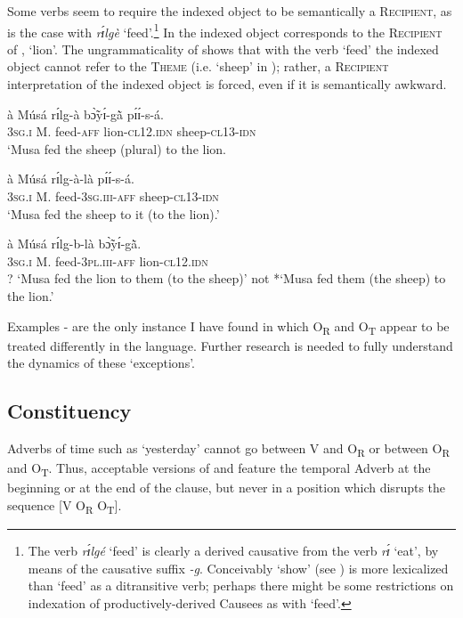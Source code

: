 \documentclass[output=paper]{langsci/langscibook}
\begin{document}
Some verbs seem to require the indexed object to be semantically a \textsc{Recipient}, as is the case with \textit{rɪ́lgè} `feed'.\footnote{ The verb \textit{rɪ́lgé} `feed' is clearly a derived causative from the verb \textit{rɪ́} `eat', by means of the causative suffix \textit{-g}. Conceivably `show' (see ) is more lexicalized than `feed' as a ditransitive verb; perhaps there might be some restrictions on indexation of productively-derived Causees as with `feed'.} In  the indexed object corresponds to the \textsc{Recipient} of , `lion'. The ungrammaticality of  shows that with the verb `feed' the indexed object cannot refer to the \textsc{Theme} (i.e. `sheep' in ); rather, a \textsc{Recipient} interpretation of the indexed object is forced, even if it is semantically awkward.

\ea
\label{ex:28.pacchiarotti}
\gll à    Músá  rɪ́lg-à    bɔ̃̀yɪ́-g\`{ã}    pɪ́ɪ́-s-á.\\
\textsc{3sg.i}    M.  feed-\textsc{aff}  lion-\textsc{cl12.idn}  sheep-\textsc{cl13-idn}\\
\glt `Musa fed the sheep (plural) to the lion.
\z

\ea
\label{ex:29.pacchiarotti}
\gll à    Músá    rɪ́lg-à-là    pɪ́ɪ́-s-á.\\
\textsc{3sg.i}    M.    feed-\textsc{3sg.iii-aff}  sheep-\textsc{cl13-idn}\\
\glt `Musa fed the sheep to it (to the lion).'
\z

\ea
\label{ex:30.pacchiarotti}
\gll à    Músá  rɪ́lg-b-là     bɔ̃̀yɪ́-g\`{ã}. \\
\textsc{3sg.i}    M.  feed-\textsc{3pl.iii-aff}    lion-\textsc{cl12.idn}\\
\glt
? `Musa fed the lion to them (to the sheep)' not *`Musa fed them (the sheep) to the lion.'  
\z

Examples - are the only instance I have found in which O\textsubscript{R} and O\textsubscript{T} appear to be treated differently in the language. Further research is needed to fully understand the dynamics of these `exceptions'.

\subsection{Constituency}\label{§4.5:constituency.pacchiarotti}

Adverbs of time such as `yesterday' cannot go between V and O\textsubscript{R} or between O\textsubscript{R} and O\textsubscript{T}. Thus, acceptable versions of  and  feature the temporal Adverb at the beginning or at the end of the clause, but never in a position which disrupts the sequence [V O\textsubscript{R} O\textsubscript{T}].
\end{document}
